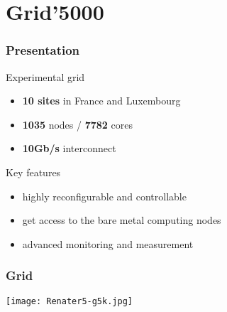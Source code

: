 \documentclass{beamer}
\title{\EventName}
\subtitle{\TPindex: \TPtitle}
\author{\authors}
\institute[UL]{
  University of Luxembourg, Luxembourg
}
\date{}
\begin{document}
\begin{frame}
    \vspace{2.5em}
    \titlepage
\end{frame}



\section{Grid'5000}

\begin{frame}[fragile]
    \frametitle{Presentation}
Experimental grid
    \begin{itemize}
      \item \textbf{10 sites} in France and Luxembourg
      \item \textbf{1035} nodes / \textbf{7782} cores
      \item \textbf{10Gb/s} interconnect
	\end{itemize}

Key features
    \begin{itemize}
      \item highly reconfigurable and controllable
      \item get access to the bare metal computing nodes
      \item advanced monitoring and measurement
	\end{itemize}

\end{frame}


\begin{frame}[fragile]
    \frametitle{Grid}
    
  \begin{center}
      \texttt{[image: Renater5-g5k.jpg]}
  \end{center}

\end{frame}
\end{document}

